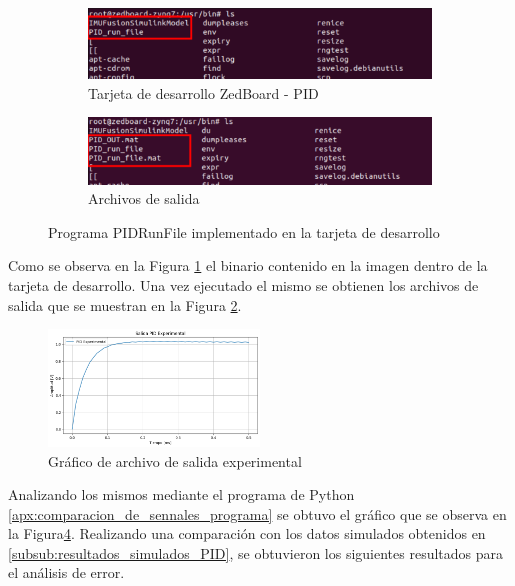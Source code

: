\begin{figure}[htbp]
    \centering
    \begin{subfigure}[b]{0.35\textwidth}
        \centering
        \includegraphics[width=\textwidth]{fig/aditional/consola_pid_imu.pdf}
        \caption{Tarjeta de desarrollo ZedBoard - PID}
        \label{fig:PID_zedboard}
    \end{subfigure}
    \hfill
    \begin{subfigure}[b]{0.45\textwidth}
        \centering
        \includegraphics[width=\textwidth]{fig/aditional/consola_pid.pdf}
        \caption{Archivos de salida}
        \label{fig:out_files_PID}
    \end{subfigure}
    \caption{Programa PIDRunFile implementado en la tarjeta de desarrollo}
    \label{fig:PID_ZEDBOARD}
\end{figure}


Como se observa en la Figura \ref{fig:PID_zedboard} el binario contenido en la imagen dentro de la tarjeta de desarrollo. Una vez ejecutado el mismo se obtienen los archivos de salida que se muestran en la Figura \ref{fig:out_files_PID}. 

\begin{figure}[h!]
    \centering
    \includegraphics[width=0.5\textwidth]{fig/Capitulo5/Caso_de_estudio_PID/datos/experimental.png}
    \caption{Gráfico de archivo de salida experimental}
    \label{fig:experimentales_PID}
\end{figure}

Analizando los mismos mediante el programa de Python \ref{apx:comparacion_de_sennales_programa} se obtuvo el gráfico que se observa en la Figura\ref{fig:experimentales_PID}. Realizando una comparación con los datos simulados obtenidos en \ref{subsub:resultados_simulados_PID}, se obtuvieron los siguientes resultados para el análisis de error.

